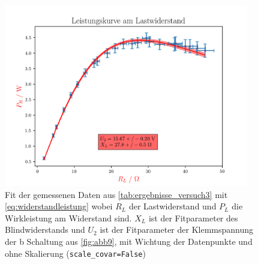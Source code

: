 \documentclass[11pt,ngerman]{scrartcl}
\begin{document}
\begin{figure}[H]
	\begin{center}
		\includegraphics[width=0.95\textwidth]{./bigpics/withweightsandscalecovarfalse.png}
	\end{center}
	\caption{Fit der gemessenen Daten aus \autoref{tab:ergebnisse_versuch3} mit
		\autoref{eq:widerstandleistung} wobei $R_L$ der Lastwiderstand und $P_L$ die
		Wirkleistung am Widerstand sind. $X_L$ ist der Fitparameter des
		Blindwiderstands und $U_2$ ist der Fitparameter der Klemmspannung der b Schaltung aus
		\autoref{fig:abb9}, mit Wichtung der Datenpunkte und ohne Skalierung (\texttt{scale\_covar=False})}
	\label{fig:fit_mit_wichtung_ohne_skalierung}
\end{figure}
\end{document}
